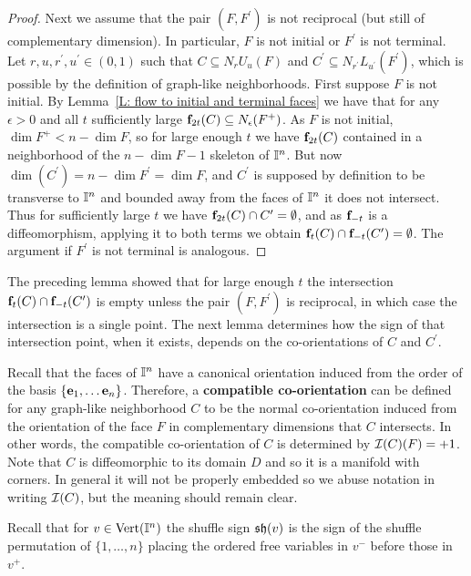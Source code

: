 \begin{proof}
	Next we assume that the pair $(F,F^\prime)$ is not reciprocal (but still of complementary dimension). In particular, $F$ is not initial or $F^\prime$ is not terminal. 
	Let $r,u,r^\prime,u^\prime \in (0,1)$ such that $C \subseteq N_rU_u(F)$ and $C^\prime \subseteq N_{r^\prime}L_{u^\prime}(F^\prime)$, which is possible by the definition of graph-like neighborhoods.
	First suppose $F$ is not initial. 
	By Lemma~\ref{L: flow to initial and terminal faces} we have that for any $\epsilon > 0$ and all $t$ sufficiently large $\mathbf{f}_{2t}(C) \subseteq N_\epsilon(F^+)$.
	As $F$ is not initial, $\dim F^+ < n-\dim F$, so for large enough $t$ we have $\mathbf{f}_{2t}(C)$ contained in a neighborhood of the $n-\dim F-1$ skeleton of $\mathbb{I}^n$. But now $\dim(C^\prime) = n-\dim F^\prime = \dim F$, and $C^\prime$ is supposed by definition to be transverse to $\mathbb{I}^n$ and bounded away from the faces of $\mathbb{I}^n$ it does not intersect.
	Thus for sufficiently large $t$ we have $\mathbf{f}_{2t}(C)\cap C^\prime = \emptyset$, and as $\mathbf{f}_{-t}$ is a diffeomorphism, applying it to both terms we obtain $\mathbf{f}_{t}(C) \cap \mathbf{f}_{-t} (C^\prime) = \emptyset$.
	The argument if $F^\prime$ is not terminal is analogous.
\end{proof}

The preceding lemma showed that for large enough $t$ the intersection $\mathbf{f}_t(C) \cap \mathbf{f}_{-t}(C^\prime)$ is empty unless the pair $(F,F^\prime)$ is reciprocal, in which case the intersection is a single point.
The next lemma determines how the sign of that intersection point, when it exists, depends on the co-orientations of $C$ and $C^\prime$. 

Recall that the faces of $\mathbb{I}^n$ have a canonical orientation induced from the order of the basis $\{\mathbf{e}_1, \dots \mathbf{e}_n\}$.
Therefore, a \textbf{compatible co-orientation} can be defined for any graph-like neighborhood $C$ to be the normal co-orientation induced from the orientation of the face $F$ in complementary dimensions that $C$ intersects.
In other words, the compatible co-orientation of $C$ is determined by $\mathcal{I}(C)(F) = +1$. Note that $C$ is diffeomorphic to its domain $D$ and so it is a manifold with corners. In general it will not be properly embedded so we abuse notation in writing $\mathcal{I}(C)$, but the meaning should remain clear. 

Recall that for $v \in {\rm Vert}(\mathbb{I}^n)$ the shuffle sign $\mathfrak{sh}(v)$ is the sign of the shuffle permutation of $\{1, \dots, n\}$ placing the ordered free variables in $v^-$ before those in $v^+$. 

